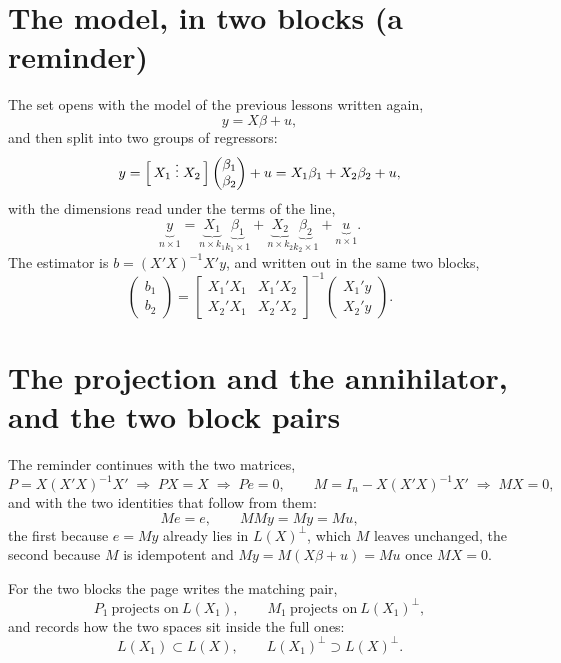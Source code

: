 \documentclass[11pt]{article}
\begin{document}

\section{The model, in two blocks (a reminder)}

The set opens with the model of the previous lessons written again,
\[ y = X\beta + u, \]
and then split into two groups of regressors:
\[ y = \Bigl[\,X_{1}\;\vdots\;X_{2}\,\Bigr]\begin{pmatrix}\beta_{1}\\ \beta_{2}\end{pmatrix} + u
   = X_{1}\beta_{1} + X_{2}\beta_{2} + u, \]
with the dimensions read under the terms of the line,
\[ \underbrace{y}_{n\times1}
   = \underbrace{X_{1}}_{n\times k_{1}}\underbrace{\beta_{1}}_{k_{1}\times1}
   + \underbrace{X_{2}}_{n\times k_{2}}\underbrace{\beta_{2}}_{k_{2}\times1}
   + \underbrace{u}_{n\times1}. \]
The estimator is $b = (X'X)^{-1}X'y$, and written out in the same two blocks,
\[
\begin{pmatrix} b_{1} \\ b_{2} \end{pmatrix}
= \begin{bmatrix} X_{1}'X_{1} & X_{1}'X_{2} \\ X_{2}'X_{1} & X_{2}'X_{2} \end{bmatrix}^{-1}
  \begin{pmatrix} X_{1}'y \\ X_{2}'y \end{pmatrix}.
\]

\section{The projection and the annihilator, and the two block pairs}

The reminder continues with the two matrices,
\[ P = X(X'X)^{-1}X' \;\Longrightarrow\; PX = X \;\Longrightarrow\; Pe = 0,
   \qquad
   M = I_{n} - X(X'X)^{-1}X' \;\Longrightarrow\; MX = 0, \]
and with the two identities that follow from them:
\[ Me = e, \qquad MMy = My = Mu, \]
the first because $e = My$ already lies in $L(X)^{\perp}$, which $M$ leaves unchanged, the second because $M$ is
idempotent and $My = M(X\beta + u) = Mu$ once $MX = 0$.

For the two blocks the page writes the matching pair,
\[ P_{1}\ \text{projects on}\ L(X_{1}), \qquad
   M_{1}\ \text{projects on}\ L(X_{1})^{\perp}, \]
and records how the two spaces sit inside the full ones:
\[ L(X_{1}) \subset L(X), \qquad L(X_{1})^{\perp} \supset L(X)^{\perp}. \]
\end{document}
